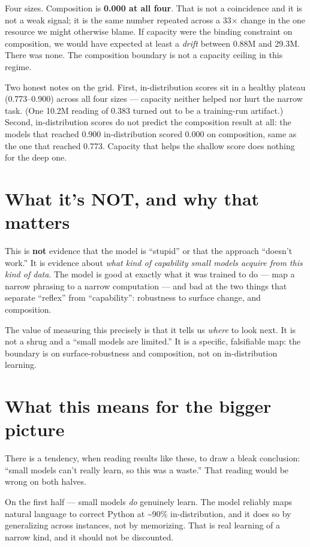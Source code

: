 Four sizes. Composition is \textbf{0.000 at all four}. That is not a
coincidence and it is not a weak signal; it is the same number repeated
across a 33× change in the one resource we might otherwise blame. If
capacity were the binding constraint on composition, we would have
expected at least a \emph{drift} between 0.88M and 29.3M. There was
none. The composition boundary is not a capacity ceiling in this regime.

Two honest notes on the grid. First, in-distribution scores sit in a
healthy plateau (0.773--0.900) across all four sizes --- capacity
neither helped nor hurt the narrow task. (One 10.2M reading of 0.383
turned out to be a training-run artifact.) Second, in-distribution
scores do not predict the composition result at all: the models that
reached 0.900 in-distribution scored 0.000 on composition, same as the
one that reached 0.773. Capacity that helps the shallow score does
nothing for the deep one.

\section{What it's NOT, and why that
matters}\label{what-its-not-and-why-that-matters}

This is \textbf{not} evidence that the model is ``stupid'' or that the
approach ``doesn't work.'' It is evidence about \emph{what kind of
capability small models acquire from this kind of data}. The model is
good at exactly what it was trained to do --- map a narrow phrasing to a
narrow computation --- and bad at the two things that separate
``reflex'' from ``capability'': robustness to surface change, and
composition.

The value of measuring this precisely is that it tells us \emph{where}
to look next. It is not a shrug and a ``small models are limited.'' It
is a specific, falsifiable map: the boundary is on surface-robustness
and composition, not on in-distribution learning.

\section{What this means for the bigger
picture}\label{what-this-means-for-the-bigger-picture}

There is a tendency, when reading results like these, to draw a bleak
conclusion: ``small models can't really learn, so this was a waste.''
That reading would be wrong on both halves.

On the first half --- small models \emph{do} genuinely learn. The model
reliably maps natural language to correct Python at \textasciitilde90\%
in-distribution, and it does so by generalizing across instances, not by
memorizing. That is real learning of a narrow kind, and it should not be
discounted.


